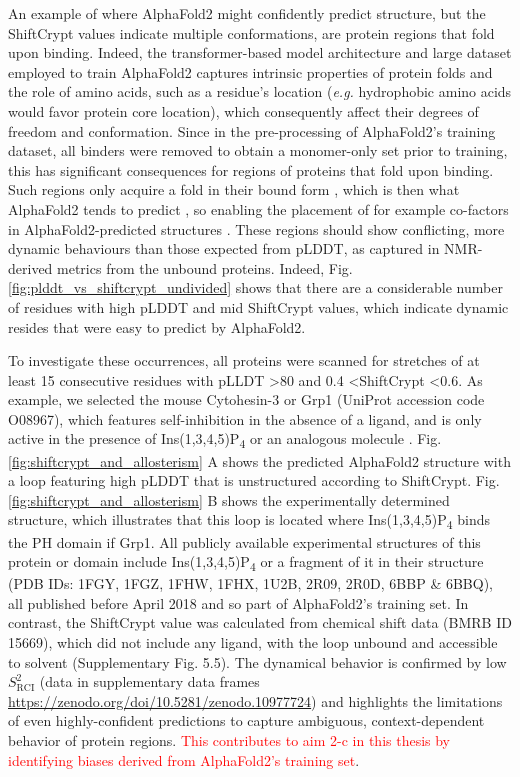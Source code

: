 An example of where AlphaFold2 might confidently predict structure, but the ShiftCrypt values indicate multiple conformations, are protein regions that fold upon binding. Indeed, the transformer-based model architecture and large dataset employed to train AlphaFold2 captures intrinsic properties of protein folds and the role of amino acids, such as a residue's location (\textit{e.g.} hydrophobic amino acids would favor protein core location), which consequently affect their degrees of freedom and conformation. Since in the pre-processing of AlphaFold2's training dataset, all binders were removed to obtain a monomer-only set prior to training, this has significant consequences for regions of proteins that fold upon binding. Such regions only acquire a fold in their bound form \cite{robustelli_mechanism_2020}, which is then what AlphaFold2 tends to predict \cite{saldano_impact_2022}, so enabling the placement of for example co-factors in AlphaFold2-predicted structures \cite{hekkelman_alphafill_2023}. These regions should show conflicting, more dynamic behaviours than those expected from pLDDT, as captured in NMR-derived metrics from the unbound proteins. Indeed, Fig. \ref{fig:plddt_vs_shiftcrypt_undivided} shows that there are a considerable number of residues with high pLDDT and mid ShiftCrypt values, which indicate dynamic resides that were easy to predict by AlphaFold2. 

To investigate these occurrences, all proteins were scanned for stretches of at least 15 consecutive residues with pLLDT \textgreater 80 and 0.4 \textless ShiftCrypt \textless 0.6. As example, we selected the mouse Cytohesin-3 or Grp1 (UniProt accession code O08967), which features self-inhibition in the absence of a ligand, and is only active in the presence of Ins(1,3,4,5)P\textsubscript{4} or an analogous molecule \cite{dinitto_structural_2007}. Fig. \ref{fig:shiftcrypt_and_allosterism} A shows the predicted AlphaFold2 structure with a loop featuring high pLDDT that is unstructured according to ShiftCrypt. Fig. \ref{fig:shiftcrypt_and_allosterism} B shows the experimentally determined structure, which illustrates that this loop is located where Ins(1,3,4,5)P\textsubscript{4} binds the PH domain if Grp1. All publicly available experimental structures of this protein or domain include Ins(1,3,4,5)P\textsubscript{4} or a fragment of it in their structure (PDB IDs: 1FGY, 1FGZ, 1FHW, 1FHX, 1U2B, 2R09, 2R0D, 6BBP \& 6BBQ), all published before April 2018 and so part of AlphaFold2's training set. In contrast, the ShiftCrypt value was calculated from chemical shift data (BMRB ID 15669), which did not include any ligand, with the loop unbound and accessible to solvent (Supplementary Fig. 5.5).
The dynamical behavior is confirmed by low \(S^{2}_{\text{RCI}}\) (data in supplementary data frames \url{https://zenodo.org/doi/10.5281/zenodo.10977724}) and highlights the limitations of even highly-confident predictions to capture ambiguous, context-dependent behavior of protein regions. \textcolor{red}{This contributes to aim 2-c in this thesis by identifying biases derived from AlphaFold2's training set}.

